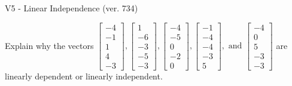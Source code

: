\begin{exercise}
  \begin{exerciseTitle}V5 - Linear Independence (ver. 734)\end{exerciseTitle}
  \begin{exerciseStatement}
    Explain why the vectors \(\left[\begin{array}{r}
-4 \\
-1 \\
1 \\
4 \\
-3
\end{array}\right] , \left[\begin{array}{r}
1 \\
-6 \\
-3 \\
-5 \\
-3
\end{array}\right] , \left[\begin{array}{r}
-4 \\
-5 \\
0 \\
-2 \\
0
\end{array}\right] , \left[\begin{array}{r}
-1 \\
-4 \\
-4 \\
-3 \\
5
\end{array}\right] , \text{ and } \left[\begin{array}{r}
-4 \\
0 \\
5 \\
-3 \\
-3
\end{array}\right]\) are linearly dependent or linearly independent.	



\end{exerciseStatement}
\end{exercise}
